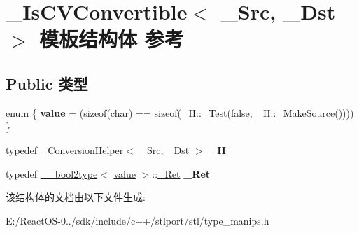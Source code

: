 \hypertarget{struct___is_c_v_convertible}{}\section{\+\_\+\+Is\+C\+V\+Convertible$<$ \+\_\+\+Src, \+\_\+\+Dst $>$ 模板结构体 参考}
\label{struct___is_c_v_convertible}
\subsection*{Public 类型}
\begin{DoxyCompactItemize}
\item 
\mbox{\label{struct___is_c_v_convertible_ad7a061656a4244b9e46e8b9359238015}} 
enum \{ {\bfseries value} = (sizeof(char) == sizeof(\+\_\+H\+:\+:\+\_\+\+Test(false, \+\_\+H\+:\+:\+\_\+\+Make\+Source())))
 \}
\item 
\mbox{\label{struct___is_c_v_convertible_ac4fc60910eaa1096c13a62bf22bc51ac}} 
typedef \hyperlink{struct___conversion_helper}{\+\_\+\+Conversion\+Helper}$<$ \+\_\+\+Src, \+\_\+\+Dst $>$ {\bfseries \+\_\+H}
\item 
\mbox{\label{struct___is_c_v_convertible_a736f86edcc451db16413a78ef196994b}} 
typedef \hyperlink{struct____bool2type}{\+\_\+\+\_\+bool2type}$<$ \hyperlink{unionvalue}{value} $>$\+::\hyperlink{struct____true__type}{\+\_\+\+Ret} {\bfseries \+\_\+\+Ret}
\end{DoxyCompactItemize}


该结构体的文档由以下文件生成\+:\begin{DoxyCompactItemize}
\item 
E\+:/\+React\+O\+S-\/0../sdk/include/c++/stlport/stl/type\+\_\+manips.\+h\end{DoxyCompactItemize}
